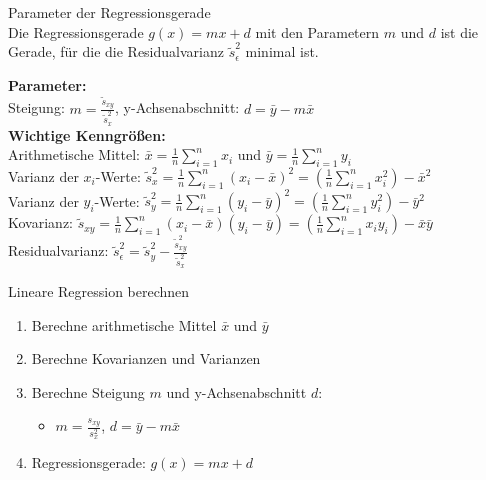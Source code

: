 \begin{theorem}{Parameter der Regressionsgerade}\\
Die Regressionsgerade $g(x) = mx + d$ mit den Parametern $m$ und $d$ ist die Gerade, für die die Residualvarianz $\tilde{s}_\epsilon^2$ minimal ist.

\textbf{Parameter:}\\
Steigung: $m = \frac{\tilde{s}_{xy}}{\tilde{s}_x^2}$,
y-Achsenabschnitt: $d = \bar{y} - m\bar{x}$\\

\textbf{Wichtige Kenngrößen:}
\vspace{2mm}\\
Arithmetische Mittel: $\bar{x} = \frac{1}{n}\sum_{i=1}^n x_i$ und $\bar{y} = \frac{1}{n}\sum_{i=1}^n y_i$\\

Varianz der $x_i$-Werte:
$\tilde{s}_x^2 = \frac{1}{n}\sum_{i=1}^n (x_i-\bar{x})^2 = (\frac{1}{n}\sum_{i=1}^n x_i^2) - \bar{x}^2$\\

Varianz der $y_i$-Werte:
$\tilde{s}_y^2 = \frac{1}{n}\sum_{i=1}^n (y_i-\bar{y})^2 = (\frac{1}{n}\sum_{i=1}^n y_i^2) - \bar{y}^2$\\

Kovarianz:
$\tilde{s}_{xy} = \frac{1}{n}\sum_{i=1}^n (x_i-\bar{x})(y_i-\bar{y}) = (\frac{1}{n}\sum_{i=1}^n x_iy_i) - \bar{x}\bar{y}$\\

Residualvarianz:
$\tilde{s}_\epsilon^2 = \tilde{s}_y^2 - \frac{\tilde{s}_{xy}^2}{\tilde{s}_x^2}$\\
\end{theorem}

\begin{KR}{Lineare Regression berechnen}
\begin{enumerate}
  \setlength{\itemsep}{1pt}
\item Berechne arithmetische Mittel $\bar{x}$ und $\bar{y}$
\item Berechne Kovarianzen und Varianzen
\item Berechne Steigung $m$ und y-Achsenabschnitt $d$:
   \begin{itemize}
     \item $m = \frac{s_{xy}}{s_x^2}$, $d = \bar{y} - m\bar{x}$
   \end{itemize}
\item Regressionsgerade: $g(x) = mx + d$
\end{enumerate}
\end{KR}

